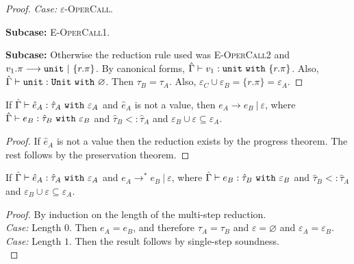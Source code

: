 \begin{appendix}
\begin{proof}
\textit{Case:}  \textsc{$\varepsilon$-OperCall}. 

\textbf{Subcase:} \textsc{E-OperCall1}.

\textbf{Subcase:} Otherwise the reduction rule used was \textsc{E-OperCall2} and $v_1.\pi \longrightarrow \mathtt{unit}~|~\{ r.\pi \}$. By canonical forms, $\hat \Gamma \vdash v_1: \mathtt{unit}~\mathtt{with}~ \{ r.\pi \}$. Also, $\hat \Gamma \vdash \mathtt{unit}: \mathtt{Unit}~\mathtt{with}~ \varnothing$. Then $\tau_B = \tau_A$. Also, $\varepsilon_C \cup \varepsilon_B = \{ r.\pi \} = \varepsilon_A$.
\end{proof}

\hrulefill

\begin{theorem}[Soundness]
If $\hat \Gamma \vdash \hat e_A: \hat \tau_A~\mathtt{with}~ \varepsilon_A$ and $\hat e_A$ is not a value, then $e_A \longrightarrow e_B~|~\varepsilon$, where $\hat \Gamma \vdash e_B: \hat \tau_B~\mathtt{with}~ \varepsilon_B$ and $\hat \tau_B <: \hat \tau_A$ and $\varepsilon_B \cup \varepsilon \subseteq \varepsilon_A$.
\end{theorem}
\begin{proof}
If $\hat e_A$ is not a value then the reduction exists by the progress theorem. The rest follows by the preservation theorem.
\end{proof}

\hrulefill

\begin{theorem}
If $\hat \Gamma \vdash \hat e_A: \hat \tau_A~\mathtt{with}~ \varepsilon_A$ and $e_A \longrightarrow^{*} e_B~|~\varepsilon$, where $\hat \Gamma \vdash e_B: \hat \tau_B~\mathtt{with}~ \varepsilon_B$ and $\hat \tau_B <: \hat \tau_A$ and $\varepsilon_B \cup \varepsilon \subseteq \varepsilon_A$.
\end{theorem}

\begin{proof} By induction on the length of the multi-step reduction.\\

\textit{Case:} Length $0$. Then $e_A = e_B$, and therefore $\tau_A = \tau_B$ and $\varepsilon = \varnothing$ and $\varepsilon_A = \varepsilon_B$.\\

\textit{Case:} Length $1$. Then the result follows by single-step soundness.\\


\end{proof}
\end{appendix}
